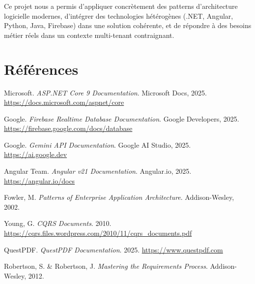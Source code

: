 \documentclass[12pt,a4paper]{report}
\begin{document}
\bigskip

Ce projet nous a permis d'appliquer concrètement des patterns d'architecture logicielle
modernes, d'intégrer des technologies hétérogènes (.NET, Angular, Python, Java, Firebase)
dans une solution cohérente, et de répondre à des besoins métier réels dans un
contexte multi-tenant contraignant.

\chapter*{Références}

\begin{enumerate}[label={[\arabic*]}]
  \item Microsoft. \textit{ASP.NET Core 9 Documentation}. Microsoft Docs, 2025.
    \url{https://docs.microsoft.com/aspnet/core}
  \item Google. \textit{Firebase Realtime Database Documentation}. Google Developers, 2025.
    \url{https://firebase.google.com/docs/database}
  \item Google. \textit{Gemini API Documentation}. Google AI Studio, 2025.
    \url{https://ai.google.dev}
  \item Angular Team. \textit{Angular v21 Documentation}. Angular.io, 2025.
    \url{https://angular.io/docs}
  \item Fowler, M. \textit{Patterns of Enterprise Application Architecture}. Addison-Wesley, 2002.
  \item Young, G. \textit{CQRS Documents}. 2010.
    \url{https://cqrs.files.wordpress.com/2010/11/cqrs_documents.pdf}
  \item QuestPDF. \textit{QuestPDF Documentation}. 2025.
    \url{https://www.questpdf.com}
  \item Robertson, S. \& Robertson, J. \textit{Mastering the Requirements Process}. Addison-Wesley, 2012.
\end{enumerate}
\end{document}
